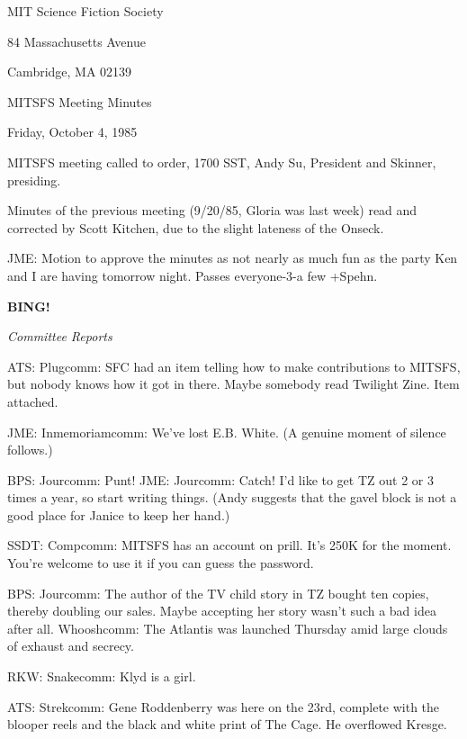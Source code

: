 \documentclass[12pt]{article}
\newcommand{\bing}{{\bf BING!} }
\newcommand{\goto}[1]{\bing \vskip 12pt \centerline{{\em{#1}}}}
\begin{document}
\begin{center}

MIT Science Fiction Society 

84 Massachusetts Avenue

Cambridge, MA 02139

\vspace{12pt}

MITSFS Meeting Minutes 

Friday, October 4, 1985

\end{center}
 
\vspace{18pt}

\setlength{\parskip}{6pt}

\noindent
MITSFS meeting called to order, 1700 SST,
Andy Su, President and Skinner, presiding.

Minutes of the previous meeting (9/20/85, Gloria was last week) read and corrected by Scott Kitchen, due to the slight lateness of the Onseck.

JME: Motion to approve the minutes as not nearly as much fun as the party Ken and I are having tomorrow night. Passes everyone-3-a few +Spehn.

\goto{Committee Reports}

ATS: Plugcomm: SFC had an item telling how to make contributions to MITSFS, but nobody knows how it got in there. Maybe somebody read Twilight Zine. Item attached.

JME: Inmemoriamcomm: We've lost E.B. White. (A genuine moment of silence follows.)

BPS: Jourcomm: Punt! JME: Jourcomm: Catch! I'd like to get TZ out 2 or 3 times a year, so start writing things. (Andy suggests that the gavel block is not a good place for Janice to keep her hand.)

SSDT: Compcomm: MITSFS has an account on prill. It's 250K for the moment. You're welcome to use it if you can guess the password.

BPS: Jourcomm: The author of the TV child story in TZ bought ten copies, thereby doubling our sales. Maybe accepting her story wasn't such a bad idea after all. Whooshcomm: The Atlantis was launched Thursday amid large clouds of exhaust and secrecy.

RKW: Snakecomm: Klyd is a girl.

ATS: Strekcomm: Gene Roddenberry was here on the 23rd, complete with the blooper reels and the black and white print of The Cage. He overflowed Kresge.
\end{document}
